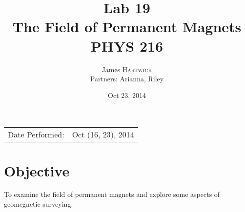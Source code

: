 \documentclass{article}
\title{Lab 19 \\ The Field of Permanent Magnets \\ PHYS 216} %
\author{James \textsc{Hartwick}\\Partners: Arianna, Riley} %
\date{Oct 23, 2014} %
\begin{document}
\maketitle %

\begin{center}
\begin{tabular}{l r}
Date Performed: & Oct (16, 23), 2014 \\ %
\end{tabular}
\end{center}



\section{Objective}
To examine the field of permanent magnets and explore some aspects of geomegnetic surveying.



\end{document}
